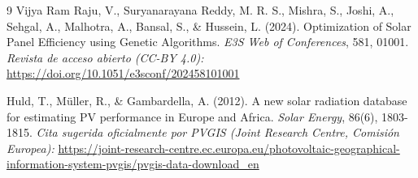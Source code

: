 \documentclass[12pt, a4paper, twocolumn]{article}
\begin{document}
\begin{thebibliography}{9}
Vijya Ram Raju, V., Suryanarayana Reddy, M. R. S., Mishra, S., Joshi, A., Sehgal, A., Malhotra, A., Bansal, S., \& Hussein, L. (2024). Optimization of Solar Panel Efficiency using Genetic Algorithms. \textit{E3S Web of Conferences}, 581, 01001. \textit{Revista de acceso abierto (CC-BY 4.0):} {\fontsize{7}{8}\selectfont\url{https://doi.org/10.1051/e3sconf/202458101001}}

Huld, T., Müller, R., \& Gambardella, A. (2012). A new solar radiation database for estimating PV performance in Europe and Africa. \textit{Solar Energy}, 86(6), 1803-1815. \textit{Cita sugerida oficialmente por PVGIS (Joint Research Centre, Comisión Europea):} {\fontsize{7}{8}\selectfont\url{https://joint-research-centre.ec.europa.eu/photovoltaic-geographical-information-system-pvgis/pvgis-data-download_en}}

\end{thebibliography}
\end{document}
